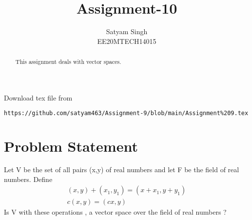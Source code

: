 \documentclass[journal,12pt,twocolumn]{IEEEtran}
\begin{document}
\renewcommand{\thefigure}{\theproblem}
\def\putbox#1#2#3{\makebox[0in][l]{\makebox[#1][l]{}\raisebox{\baselineskip}[0in][0in]{\raisebox{#2}[0in][0in]{#3}}}}
     \def\rightbox#1{\makebox[0in][r]{#1}}
     \def\centbox#1{\makebox[0in]{#1}}
     \def\topbox#1{\raisebox{-\baselineskip}[0in][0in]{#1}}
     \def\midbox#1{\raisebox{-0.5\baselineskip}[0in][0in]{#1}}
\vspace{3cm}
\title{Assignment-10}
\author{Satyam Singh \\ EE20MTECH14015}
\maketitle
\newpage
\bigskip
\renewcommand{\thefigure}{\theenumi}
\renewcommand{\thetable}{\theenumi}
\begin{abstract}
This assignment deals with vector spaces.
\end{abstract}
Download  tex file from 
\begin{lstlisting}
https://github.com/satyam463/Assignment-9/blob/main/Assignment%209.tex
\end{lstlisting}
\section{Problem Statement}
Let V be the set of all pairs (x,y) of real numbers and let F be the field of real numbers. Define 
\begin{align}
(x,y)+(x_1,y_1)=(x+x_1,y+y_1)\\
c(x,y)=(cx,y)
\end{align}
Is V with these operations , a vector space over the field of real numbers ?
\end{document}
